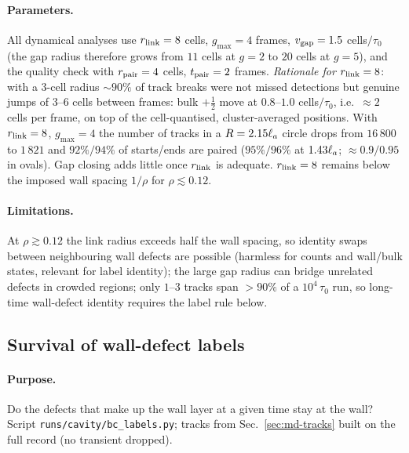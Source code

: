 \paragraph{Parameters.} All dynamical analyses use $r_{\rm link}=8$ cells, $g_{\max}=4$ frames, $v_{\rm gap}=1.5$ cells$/\tau_0$
(the gap radius therefore grows from $11$ cells at $g=2$ to $20$ cells at $g=5$), and the quality check with $r_{\rm pair}=4$ cells,
$t_{\rm pair}=2$ frames.
\emph{Rationale for $r_{\rm link}=8$}: with a $3$-cell radius $\sim90\%$ of track breaks were not missed detections but genuine jumps of
$3$--$6$ cells between frames: bulk $+\tfrac12$ move at $0.8$--$1.0$ cells$/\tau_0$, i.e.\ $\approx2$ cells per frame, on top of the
cell-quantised, cluster-averaged positions. With $r_{\rm link}=8$, $g_{\max}=4$ the number of tracks in a $R=2.15\ell_a$ circle drops
from $16\,800$ to $1\,821$ and $92\%/94\%$ of starts/ends are paired ($95\%/96\%$ at $1.43\ell_a$; $\approx0.9/0.95$ in ovals). Gap closing
adds little once $r_{\rm link}$ is adequate. $r_{\rm link}=8$ remains below the imposed wall spacing $1/\rho$ for $\rho\lesssim0.12$.

\paragraph{Limitations.} At $\rho\gtrsim0.12$ the link radius exceeds half the wall spacing, so identity swaps between neighbouring wall
defects are possible (harmless for counts and wall/bulk states, relevant for label identity); the large gap radius can bridge unrelated
defects in crowded regions; only $1$--$3$ tracks span $>90\%$ of a $10^4\,\tau_0$ run, so long-time wall-defect identity requires the
label rule below.

\subsection{Survival of wall-defect labels}
\label{sec:md-labels}

\paragraph{Purpose.} Do the defects that make up the wall layer at a given time stay at the wall? Script
\texttt{runs/cavity/bc\_labels.py}; tracks from Sec.~\ref{sec:md-tracks} built on the full record (no transient dropped).

